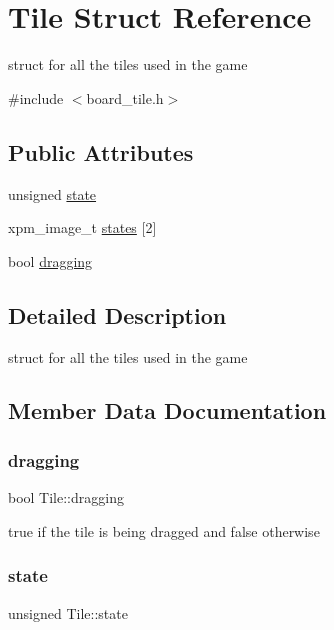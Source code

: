 \hypertarget{structTile}{}\section{Tile Struct Reference}
\label{structTile}


struct for all the tiles used in the game  




{\ttfamily \#include $<$board\+\_\+tile.\+h$>$}

\subsection*{Public Attributes}
\begin{DoxyCompactItemize}
\item 
unsigned \hyperlink{structTile_a15d5325552bc09d88b725b6bac8794eb}{state}
\item 
xpm\+\_\+image\+\_\+t \hyperlink{structTile_ac2305203d73f4be5ecfe5e4e393e58ab}{states} \mbox{[}2\mbox{]}
\item 
bool \hyperlink{structTile_a44f568536505b3612f94b2be8f186625}{dragging}
\end{DoxyCompactItemize}


\subsection{Detailed Description}
struct for all the tiles used in the game 

\subsection{Member Data Documentation}
\mbox{\label{structTile_a44f568536505b3612f94b2be8f186625}} 
\subsubsection{\texorpdfstring{dragging}{dragging}}
{\footnotesize\ttfamily bool Tile\+::dragging}

true if the tile is being dragged and false otherwise \mbox{\label{structTile_a15d5325552bc09d88b725b6bac8794eb}} 
\subsubsection{\texorpdfstring{state}{state}}
{\footnotesize\ttfamily unsigned Tile\+::state}

